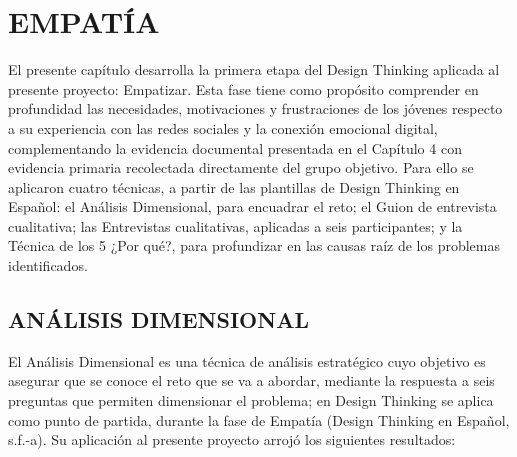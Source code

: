 \chapter{EMPATÍA}
El presente capítulo desarrolla la primera etapa del Design Thinking aplicada al presente proyecto: Empatizar. Esta fase tiene como propósito comprender en profundidad las necesidades, motivaciones y frustraciones de los jóvenes respecto a su experiencia con las redes sociales y la conexión emocional digital, complementando la evidencia documental presentada en el Capítulo 4 con evidencia primaria recolectada directamente del grupo objetivo. Para ello se aplicaron cuatro técnicas, a partir de las plantillas de Design Thinking en Español: el Análisis Dimensional, para encuadrar el reto; el Guion de entrevista cualitativa; las Entrevistas cualitativas, aplicadas a seis participantes; y la Técnica de los 5 ¿Por qué?, para profundizar en las causas raíz de los problemas identificados.

\section{ANÁLISIS DIMENSIONAL}
El Análisis Dimensional es una técnica de análisis estratégico cuyo objetivo es asegurar que se conoce el reto que se va a abordar, mediante la respuesta a seis preguntas que permiten dimensionar el problema; en Design Thinking se aplica como punto de partida, durante la fase de Empatía (Design Thinking en Español, s.f.-a). Su aplicación al presente proyecto arrojó los siguientes resultados:

